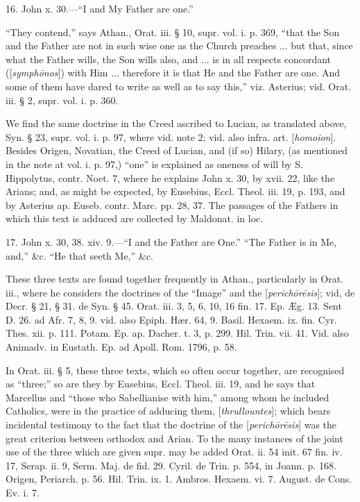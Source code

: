 16. John x. 30.—``I and My Father are one.''

``They contend,'' says Athan., Orat. iii. § 10,
supr. vol. i. p. 369, ``that the Son and the Father are not in such
wise one as the Church preaches ... but that, since what the Father
wills, the Son wills also, and ... is in all respects concordant ([\emph{symph\={o}nos}])
with Him ... therefore it is that He and the Father are one. And some
of them have dared to write as well as to say this,'' viz. Asterius;
vid. Orat. iii. § 2, supr. vol. i. p. 360.

We find the same doctrine in the Creed ascribed
to Lucian, as translated above, Syn. § 23, supr. vol. i. p. 97, where
vid. note 2; vid. also infra. art. [\emph{homoion}]. Besides Origen,
Novatian, the Creed of Lucian, and (if so) Hilary, (as mentioned in
the note at vol. i. p. 97,) ``one'' is explained as oneness of will by
S. Hippolytus, contr. Noet. 7, where he explains John x. 30, by xvii.
22, like the Arians; and, as might be expected, by Eusebius, Eccl.
Theol. iii. 19, p. 193, and by Asterius ap. Euseb. contr. Marc. pp.
28, 37. The passages of the Fathers in which this text is adduced are
collected by Maldonat. in loc.

17. John x. 30, 38. xiv. 9.—``I and the Father
are One.'' ``The Father is in Me, and,'' \&c. ``He that seeth Me,''
\&c.

These three texts are found together frequently
in Athan., particularly in Orat. iii., where he considers the
doctrines of the ``Image'' and the [\emph{perich\={o}r\={e}sis}];
vid, de Decr. § 21, § 31. de Syn. § 45. Orat. iii. 3, 5, 6,
10, 16 fin. 17. Ep. Æg. 13. Sent D. 26. ad Afr. 7, 8, 9. vid. also
Epiph. Hær. 64, 9. Basil. Hexaem. ix. fin. Cyr. Thes. xii. p. 111.
Potam. Ep. ap. Dacher. t. 3, p. 299. Hil. Trin. vii. 41. Vid. also
Animadv. in Eustath. Ep. ad Apoll. Rom. 1796, p. 58.

In Orat. iii. § 5, these three texts, which so
often occur together, are recognised as ``three;'' so are they by
Eusebius, Eccl. Theol. iii. 19, and he says that Marcellus and ``those
who Sabellianise with him,'' among whom he included Catholics, were in
the practice of adducing them, [\emph{thrullountes}]; which bears
incidental testimony to the fact that the doctrine of the [\emph{perich\={o}r\={e}sis}]
was the great criterion between orthodox and Arian. To the many
instances of the joint use of the three which are given supr. may be
added Orat. ii. 54 init. 67 fin. iv. 17, Serap. ii. 9, Serm. Maj. de
fid. 29. Cyril. de Trin. p. 554, in Joann. p. 168. Origen, Periarch.
p. 56. Hil. Trin. ix. 1. Ambros. Hexaem. vi. 7. August. de Cons. Ev. i.
7.

